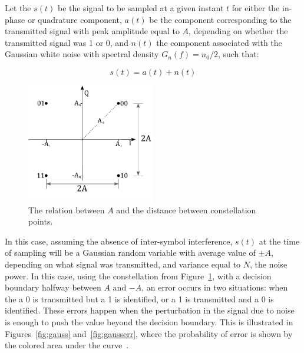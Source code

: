 \begin{refsection}
Let the $s(t)$ be the signal to be sampled at a given instant $t$ for either the
in-phase or quadrature component, $a(t)$ be the component corresponding to the
transmitted signal with peak amplitude equal to $A$, depending on whether the
transmitted signal was 1 or 0, and $n(t)$ the component associated with the
Gaussian white noise with spectral density $G_n(f) = n_0/2$, such that:

\begin{equation}\label{eq:sigAmpNoise}
s(t) = a(t) + n(t)
\end{equation}

\begin{figure}[H]
	\centering
	\includegraphics[width=0.5\textwidth]{./sdf/m_qam_system/figures/constellation_d.pdf}
	\caption{The relation between $A$ and the distance between constellation points.\label{fig:const_2m}}
\end{figure}

In this case, assuming the absence of inter-symbol interference, $s(t)$ at the
time of sampling will be a Gaussian random variable with average value of $\pm
A$, depending on what signal was transmitted, and variance equal to $N$, the
noise power. In this case, using the constellation from
Figure~\ref{fig:const_2m}, with a decision boundary halfway between $A$ and
$-A$, an error occurs in two situations: when the a 0 is transmitted but a 1 is
identified, or a 1 is transmitted and a 0 is identified. These errors happen
when the perturbation in the signal due to noise is enough to push the value
beyond the decision boundary. This is illustrated in Figures~\ref{fig:gauss}
and~\ref{fig:gausserr}, where the probability of error is shown by the colored
area under the curve~\cite{schwartz90}.



\end{refsection}
